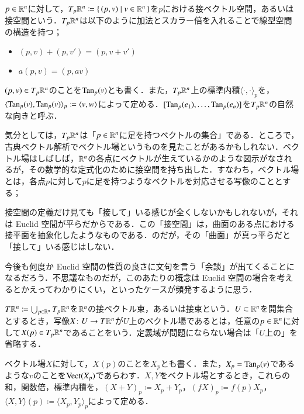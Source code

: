 \begin{defi}
$p \in \mathbb{R}^n$に対して，$T_p \mathbb{R}^n \coloneqq \set{(p,v)| v \in \mathbb{R}^n}$を$p$における接ベクトル空間，あるいは接空間という．$T_p \mathbb{R}^n$は以下のように加法とスカラー倍を入れることで線型空間の構造を持つ；
\begin{itemize}
\item $(p, v) + (p, v') = (p, v+v')$
\item $a(p,v) = (p, av)$
\end{itemize}
$(p,v) \in T_p \mathbb{R}^n$のことを$\operatorname{Tan}_p(v)$とも書く．また，$T_p \mathbb{R}^n$上の標準内積$\langle \cdot, \cdot \rangle_p$を，$\langle \operatorname{Tan}_p(v), \operatorname{Tan}_p(v) \rangle_p \coloneqq \langle v, w \rangle$によって定める．$[\operatorname{Tan}_p(e_1), \dots, \operatorname{Tan}_p(e_n)]$を$T_p \mathbb{R}^n$の自然な向きと呼ぶ．
\end{defi}

気分としては，$T_p \mathbb{R}^n$は「$p \in \mathbb{R}^n$に足を持つベクトルの集合」である．ところで，古典ベクトル解析でベクトル場というものを見たことがあるかもしれない．ベクトル場はしばしば，$\mathbb{R}^n$の各点にベクトルが生えているかのような図示がなされるが，その数学的な定式化のために接空間を持ち出した．すなわち，ベクトル場とは，各点$p$に対して$p$に足を持つようなベクトルを対応させる写像のこととする；

\begin{dig}
接空間の定義だけ見ても「接して」いる感じが全くしないかもしれないが，それは Euclid 空間が平らだからである．この「接空間」は，曲面のある点における接平面を抽象化したようなものである．のだが，その「曲面」が真っ平らだと「接して」いる感じはしない．

今後も何度か Euclid 空間の性質の良さに文句を言う「余談」が出てくることになるだろう．不思議なものだが，このあたりの概念は Euclid 空間の場合を考えるとかえってわかりにくい，といったケースが頻発するように思う．
\end{dig}

\begin{defi}
$T\mathbb{R}^n \coloneqq \bigcup_{p \in \mathbb{R}^n} T_p \mathbb{R}^n$を$\mathbb{R}^n$の接ベクトル束，あるいは接束という．$U \subset \mathbb{R}^n$を開集合とするとき，写像$X \colon U \to T \mathbb{R}^n$が$U$上のベクトル場であるとは，任意の$p \in \mathbb{R}^n$に対して$X(p) \in T_p \mathbb{R}^n$であることをいう．定義域が問題にならない場合は「$U$上の」を省略する．

ベクトル場$X$に対して，$X(p)$のことを$X_p$とも書く．また，$X_p = \operatorname{Tan}_p(v)$であるような$v$のことを$\operatorname{Vect}(X_p)$であらわす．$X,Y$をベクトル場とするとき，これらの和，関数倍，標準内積を，$(X+Y)_p \coloneqq X_p + Y_p$，$(fX)_p \coloneqq f(p) X_p$，$\langle X, Y \rangle (p) \coloneqq \langle X_p, Y_p \rangle_p$によって定める．
\end{defi}

